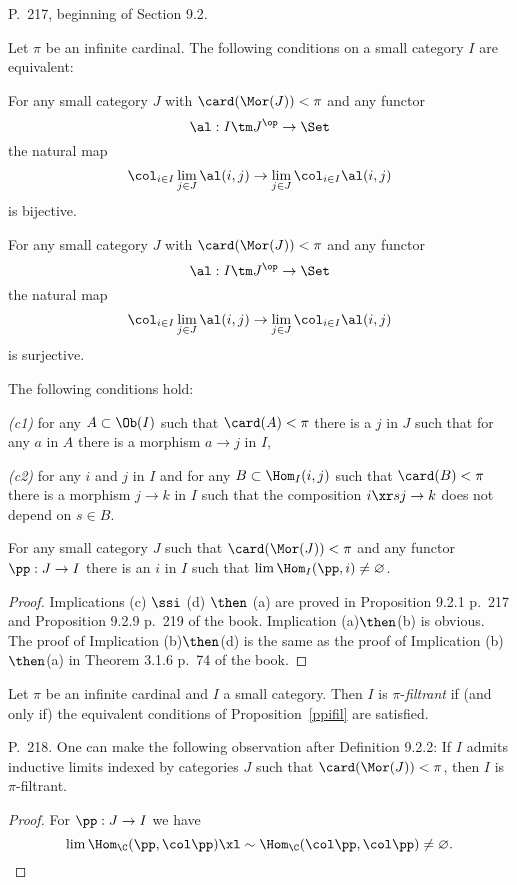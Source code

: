 \documentclass[12pt]{article}
\theoremstyle{remark}
\theoremstyle{definition}
\begin{document}
\begin{s}
P.~217, beginning of Section 9.2. 

\begin{prop}
Let $\pi$ be an infinite cardinal. The following conditions on a small category $I$ are equivalent:

 For any small category $J$ with $\card(\Mor(J))<\pi$ and any functor 
$$
\al:I\tm J^{\op}\to\Set
$$ 
the natural map 
$$
\col_{i\in I}\lim_{j\in J}\al(i,j)\to\lim_{j\in J}\col_{i\in I}\al(i,j)
$$ 
is bijective.

 For any small category $J$ with $\card(\Mor(J))<\pi$ and any functor 
$$
\al:I\tm J^{\op}\to\Set
$$ 
the natural map 
$$
\col_{i\in I}\lim_{j\in J}\al(i,j)\to\lim_{j\in J}\col_{i\in I}\al(i,j)
$$ 
is surjective.

 The following conditions hold:

{\em(c1)} for any $A\subset\Ob(I)$ such that $\card(A)<\pi$ there is a $j$ in $J$ such that for any $a$ in $A$ there is a morphism $a\to j$ in $I$,

{\em(c2)} for any $i$ and $j$ in $I$ and for any $B\subset\Hom_I(i,j)$ such that $\card(B)<\pi$ there is a morphism $j\to k$ in $I$ such that the composition $i\xr sj\to k$ does not depend on $s\in B$.

 For any small category $J$ such that $\card(\Mor(J))<\pi$ and any functor $\pp:J\to I$ there is an $i$ in $I$ such that $\lim\Hom_I(\pp,i)\neq\varnothing$. 
\end{prop}

\begin{proof}
Implications (c) $\ssi$ (d) $\then$ (a) are proved in Proposition 9.2.1 p.~217 and Proposition 9.2.9 p.~219 of the book. Implication (a)$\then$(b) is obvious. The proof of Implication (b)$\then$(d) is the same as the proof of Implication (b)$\then$(a) in Theorem 3.1.6 p.~74 of the book.
\end{proof}

\begin{df} 
Let $\pi$ be an infinite cardinal and $I$ a small category. Then $I$ is $\pi$-{\em filtrant} if (and only if) the equivalent conditions of Proposition~\ref{ppifil} are satisfied.
\end{df}
\end{s}

%

\begin{s}
P.~218. One can make the following observation after Definition 9.2.2: If $I$ admits inductive limits indexed by categories $J$ such that $\card(\Mor(J))<\pi$, then $I$ is $\pi$-filtrant.

\begin{proof}
For $\pp:J\to I$ we have
$$
\lim\Hom_\C(\pp,\col\pp)\xl\sim\Hom_\C(\col\pp,\col\pp)\neq\varnothing.
$$
\end{proof}
\end{s}
\end{document}
